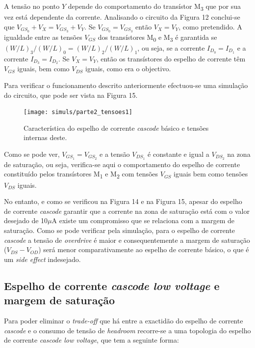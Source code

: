 \documentclass[11pt]{article}
\numberwithin{equation}{section}
\begin{document}
A tensão no ponto $Y$ depende do comportamento do transístor M\textsubscript{3} que por sua vez está dependente da corrente. Analisando o circuito da Figura 12 conclui-se que $V_{GS_{0}} + V_{X} = V_{GS_{3}} + V_{Y}$. Se $V_{GS_{0}} = V_{GS_{3}}$ então $V_{X} = V_{Y}$, como pretendido. A igualdade entre as tensões $V_{GS}$ dos transístores M\textsubscript{0} e M\textsubscript{3} é garantida se $({W}/{L})_{3}/({W}/{L})_{0} = ({W}/{L})_{2}/({W}/{L})_{1}$, ou seja, se a corrente $I_{D_{0}} = I_{D_{1}}$ e a corrente $I_{D_{3}} = I_{D_{2}}$. Se $V_{X} = V_{Y}$, então os transístores do espelho de corrente têm $V_{GS}$ iguais, bem como $V_{DS}$ iguais, como era o objectivo.

Para verificar o funcionamento descrito anteriormente efectuou-se uma simulação do circuito, que pode ser vista na Figura 15.

\pagebreak

\begin{figure}[h]
	\centering
	\texttt{[image: simuls/parte2\_tensoes1]}
	\vspace{-0.8em}
	\caption{Característica do espelho de corrente \textit{cascode} básico e tensões internas deste.}
	\vspace{-0.8em}
\end{figure} 

Como se pode ver, $V_{GS_1} = V_{GS_2}$ e a tensão $V_{DS_1}$ é constante e igual a $V_{DS_2}$ na zona de saturação, ou seja, verifica-se aqui o comportamento do espelho de corrente constituído pelos transístores M\textsubscript{1} e M\textsubscript{2} com tensões $V_{GS}$ iguais bem como tensões $V_{DS}$ iguais. 

No entanto, e como se verificou na Figura 14 e na Figura 15, apesar do espelho de corrente \textit{cascode} garantir que a corrente na zona de saturação está com o valor desejado de 10$\mu$A existe um compromisso que se relaciona com a margem de saturação. Como se pode verificar pela simulação, para o espelho de corrente \textit{cascode} a tensão de \textit{overdrive} é maior e consequentemente a margem de saturação ($V_{DS} - V_{OD}$) será menor comparativamente ao espelho de corrente básico, o que é um \textit{side effect} indesejado.

\subsection{Espelho de corrente \textit{cascode low voltage} e margem de saturação}

Para poder eliminar o \textit{trade-off} que há entre a exactidão do espelho de corrente \textit{cascode} e o consumo de tensão de \textit{headroom} recorre-se a uma topologia do espelho de corrente \textit{cascode low voltage}, que tem a seguinte forma:
\end{document}
